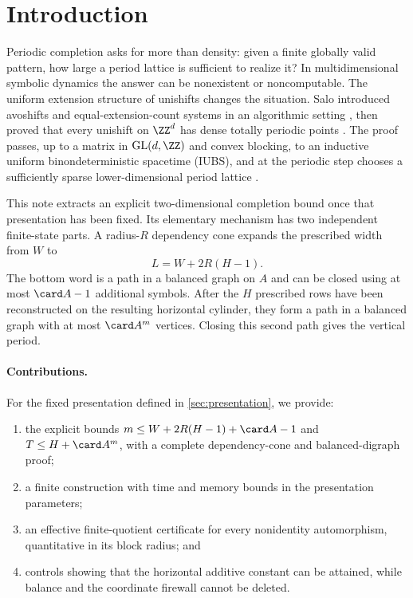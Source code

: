 \section{Introduction}

Periodic completion asks for more than density: given a finite globally valid pattern, how large a period lattice is sufficient to realize it?  In multidimensional symbolic dynamics the answer can be nonexistent or noncomputable.  The uniform extension structure of unishifts changes the situation.  Salo introduced avoshifts and equal-extension-count systems in an algorithmic setting \citep{salo2024avoshifts}, then proved that every unishift on $\ZZ^d$ has dense totally periodic points \citep[Theorem~9]{salo2025iubs}.  The proof passes, up to a matrix in $\mathrm{GL}(d,\ZZ)$ and convex blocking, to an inductive uniform binondeterministic spacetime (IUBS), and at the periodic step chooses a sufficiently sparse lower-dimensional period lattice \citep[Lemma~25]{salo2025iubs}.

This note extracts an explicit two-dimensional completion bound once that presentation has been fixed.  Its elementary mechanism has two independent finite-state parts.  A radius-$R$ dependency cone expands the prescribed width from $W$ to
\begin{equation}\label{eq:L}
 L=W+2R(H-1).
\end{equation}
The bottom word is a path in a balanced graph on $A$ and can be closed using at most $\card A-1$ additional symbols.  After the $H$ prescribed rows have been reconstructed on the resulting horizontal cylinder, they form a path in a balanced graph with at most $\card A^m$ vertices.  Closing this second path gives the vertical period.

\paragraph{Contributions.}
For the fixed presentation defined in \cref{sec:presentation}, we provide:
\begin{enumerate}
\item the explicit bounds
      $m\leq W+2R(H-1)+\card A-1$ and
      $T\leq H+\card A^m$, with a complete dependency-cone and balanced-digraph proof;
\item a finite construction with time and memory bounds in the presentation parameters;
\item an effective finite-quotient certificate for every nonidentity automorphism, quantitative in its block radius; and
\item controls showing that the horizontal additive constant can be attained, while balance and the coordinate firewall cannot be deleted.
\end{enumerate}

